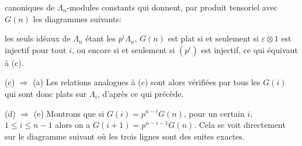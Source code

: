 \documentclass[11pt]{article}
\newcommand{\scanpage}[1]{\par\bigskip\noindent{\small\sffamily[scan #1]}\par}
\newcommand{\mspage}[1]{{\small\sffamily[p.\,#1]}}
\newcommand{\hand}[1]{\textcolor{blue}{#1}}
\newenvironment{diagramblock}{\par\begin{center}}{\end{center}\par}
\begin{document}
\mspage{\hand{57}}

\clearpage
\scanpage{129/58}
\mspage{III-3}

canoniques de $\Lambda_n$-modules constants qui donnent, par produit tensoriel
avec $G(n)$ les diagrammes suivants:

\begin{diagramblock}
\qquad
{}
\end{diagramblock}

les seuls idéaux de $\Lambda_n$ étant les $p^i\Lambda_n$, $G(n)$ est plat si et seulement
si $\varepsilon\otimes 1$ est injectif pour tout $i$, ou encore si et seulement si $(p^i)$
est injectif, ce qui équivaut à (c).

(c) $\Rightarrow$ (a) Les relations analogues à (c) sont alors vérifiées par
tous les $G(i)$ qui sont donc plats sur $\Lambda_i$, d'après ce qui précède.

(d) $\Rightarrow$ (e) Montrons que si $G(i) = p^{n-i}G(n)$, pour un certain $i$,
$1 \leq i \leq n-1$ alors on a $G(i+1) = p^{n-i-1}G(n)$. Cela se voit directement sur
le diagramme suivant où les trois lignes sont des suites exactes.

\begin{diagramblock}
\end{diagramblock}
\end{document}
